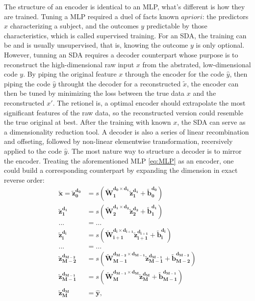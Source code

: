 \documentclass[twocolumn]{article}
\begin{document}
The structure of an encoder is identical to an MLP, what's different is how they are trained. Tuning a MLP required a duel of facts known $a priori$: the predictors $x$ characterizing a subject, and the outcomes $y$ predictable by those characteristics, which is called supervised training. For an SDA, the training can be and is usually unsupervised, that is, knowing the outcome $y$ is only optional. However, tunning an SDA requires a decoder counterpart whose purpose is to reconstruct the  high-dimensional raw input $x$ from the abstrated, low-dimensional code $y$. By piping the original feature $x$ through the encoder for the code $\hat{y}$, then piping the code $\hat{y}$ throught the decoder for a reconstructed $\tilde{x}$, the encoder can then be tuned by minimizing the loss between the true data $x$ and the reconstructed $x'$. The retionel is, a optimal encoder should extrapolate the most significant features of the raw data, so the reconstructed version could resemble the true original at best. After the training with known $x$, the SDA can serve as a dimensionality reduction tool.
A decoder is also a series of linear recombination and offseting, followed by non-linear elementwise transformation, recersively applied to the code $\hat{y}$. The most nature way to structure a decoder is to mirror the encoder. Treating the aforementioned MLP \ref{eq:MLP} as an encoder, one could build a corresponding counterpart by expanding the dimension in exact reverse order:
\begin{equation} \label{eq:DEC}
\begin{split}
  \boldsymbol{\tilde{x}}=
  \boldsymbol{\tilde{z}_{0  }^{d_{0  }}} &= s(\boldsymbol{\tilde{W}_{1  }^{d_{0  } \times d_{1  }} \tilde{z}_{1  }^{d_{1  }}}+\boldsymbol{\tilde{b}_{0  }^{d_{0  }}}) \\
  \boldsymbol{\tilde{z}_{1  }^{d_{1  }}} &= s(\boldsymbol{\tilde{W}_{2  }^{d_{1  } \times d_{2  }} \tilde{z}_{2  }^{d_{2  }}}+\boldsymbol{\tilde{b}_{1  }^{d_{1  }}}) \\
  ... &= ... \\
  \boldsymbol{\tilde{z}_{i  }^{d_{i  }}} &= s(\boldsymbol{\tilde{W}_{i+1}^{d_{i  } \times d_{i+1}} \tilde{z}_{i+1}^{d_{i+1}}}+\boldsymbol{\tilde{b}_{i  }^{d_{i  }}}) \\
  ... &= ... \\
  \boldsymbol{\tilde{z}_{M-2}^{d_{M-2}}} &= s(\boldsymbol{\tilde{W}_{M-1}^{d_{M-2} \times d_{M-1}} \tilde{z}_{M-1}^{d_{M-1}}}+\boldsymbol{\tilde{b}_{M-2}^{d_{M-2}}}) \\
  \boldsymbol{\tilde{z}_{M-1}^{d_{M-1}}} &= s(\boldsymbol{\tilde{W}_{M  }^{d_{M-1} \times d_{M  }} \tilde{z}_{M  }^{d_{M  }}}+\boldsymbol{\tilde{b}_{M-1}^{d_{M-1}}}) \\
  \boldsymbol{\tilde{z}_{M  }^{d_{M  }}} &= \boldsymbol{\hat{y}},
\end{split}
\end{equation}
\end{document}
